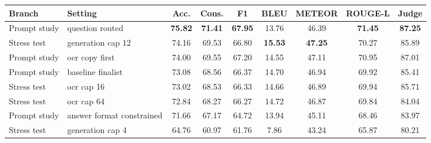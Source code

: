 \begin{tabular}{llccccccc}
\toprule
Branch & Setting & Acc. & Cons. & F1 & BLEU & METEOR & ROUGE-L & Judge\\
\midrule
Prompt study & question routed & \textbf{75.82} & \textbf{71.41} & \textbf{67.95} & 13.76 & 46.39 & \textbf{71.45} & \textbf{87.25}\\
Stress test & generation cap 12 & 74.16 & 69.53 & 66.80 & \textbf{15.53} & \textbf{47.25} & 70.27 & 85.89\\
Prompt study & ocr copy first & 74.00 & 69.55 & 67.20 & 14.55 & 47.11 & 70.95 & 87.01\\
Prompt study & baseline finalist & 73.08 & 68.56 & 66.37 & 14.70 & 46.94 & 69.92 & 85.41\\
Stress test & ocr cap 16 & 73.02 & 68.53 & 66.33 & 14.66 & 46.89 & 69.94 & 85.71\\
Stress test & ocr cap 64 & 72.84 & 68.27 & 66.27 & 14.72 & 46.87 & 69.84 & 84.04\\
Prompt study & answer format constrained & 71.66 & 67.17 & 64.72 & 13.94 & 45.11 & 68.46 & 83.97\\
Stress test & generation cap 4 & 64.76 & 60.97 & 61.76 & 7.86 & 43.24 & 65.87 & 80.21\\
\bottomrule
\end{tabular}
